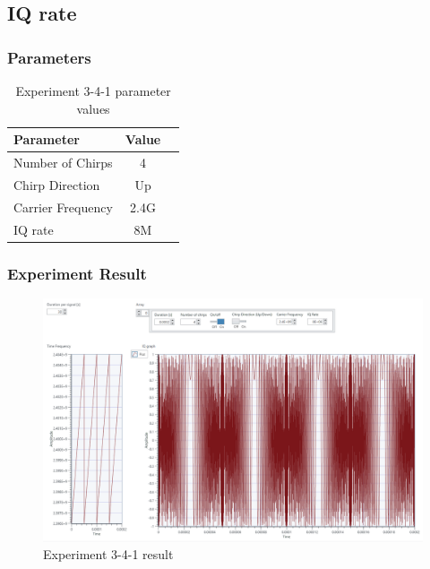     


\subsection{IQ rate}
    
    \subsubsection*{Parameters}
    \begin{table}[!h]\centering
        \hspace{10mm}
        \begin{tabular}{|l|c|c|}
        \hline
        \multicolumn{1}{|l|}{Parameter} & \multicolumn{1}{l|}{Value} \\
        \hline
        Number of Chirps & 4 \\ 
        \hline
        Chirp Direction & Up \\ 
        \hline
        Carrier Frequency & 2.4G \\ 
        \hline
        IQ rate & 8M \\ 
        \hline
        \end{tabular}
        \caption{Experiment 3-4-1 parameter values}
    \end{table}
    
    \subsubsection*{Experiment Result}
    \vspace{-4mm}  
    \begin{figure}[!h]\raggedleft
    \hspace{15mm}
		\includegraphics[width=.95\textwidth]{image/week03/3-4-1.png}
		\caption{\footnotesize Experiment 3-4-1 result}
		\vspace{-10pt}
    \end{figure}
    
